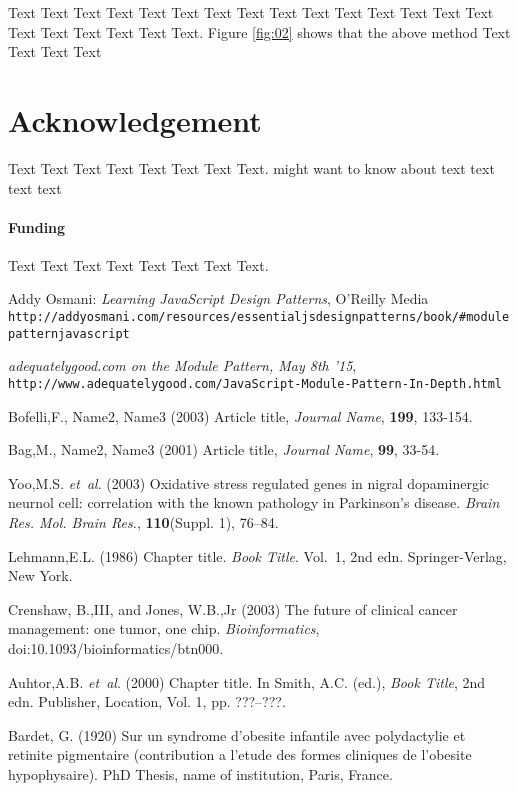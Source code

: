\documentclass{bioinfo}
\begin{document}
Text Text Text Text Text Text  Text Text Text Text Text Text Text Text Text  Text Text Text Text Text Text. Figure \ref{fig:02} shows that the above method  Text Text Text Text


\section*{Acknowledgement}
Text Text Text Text Text Text  Text Text.  \citealp{Boffelli03} might want to know about  text text text text

\paragraph{Funding\textcolon} Text Text Text Text Text Text  Text Text.

%
%
%
%
%
%
%
%
%


\begin{thebibliography}{}


 Addy Osmani: \emph{Learning JavaScript Design Patterns}, O'Reilly Media \verb|http://addyosmani.com/resources/essentialjsdesignpatterns/book/#modulepatternjavascript|

 \emph{adequatelygood.com on the Module Pattern, May 8th '15}, \verb|http://www.adequatelygood.com/JavaScript-Module-Pattern-In-Depth.html|


 Bofelli,F., Name2, Name3 (2003) Article title, {\it Journal Name}, {\bf 199}, 133-154.

 Bag,M., Name2, Name3 (2001) Article title, {\it Journal Name}, {\bf 99}, 33-54.

Yoo,M.S. \textit{et~al}. (2003) Oxidative stress regulated genes
in nigral dopaminergic neurnol cell: correlation with the known
pathology in Parkinson's disease. \textit{Brain Res. Mol. Brain
Res.}, \textbf{110}(Suppl. 1), 76--84.

Lehmann,E.L. (1986) Chapter title. \textit{Book Title}. Vol.~1, 2nd edn. Springer-Verlag, New York.

Crenshaw, B.,III, and Jones, W.B.,Jr (2003) The future of clinical
cancer management: one tumor, one chip. \textit{Bioinformatics},
doi:10.1093/bioinformatics/btn000.

Auhtor,A.B. \textit{et~al}. (2000) Chapter title. In Smith, A.C.
(ed.), \textit{Book Title}, 2nd edn. Publisher, Location, Vol. 1, pp.
???--???.

Bardet, G. (1920) Sur un syndrome d'obesite infantile avec
polydactylie et retinite pigmentaire (contribution a l'etude des
formes cliniques de l'obesite hypophysaire). PhD Thesis, name of
institution, Paris, France.

\end{thebibliography}
\end{document}
